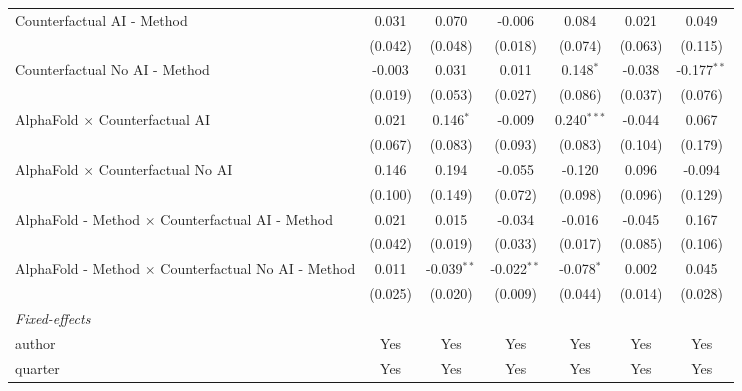 \begin{tabular}{lcccccc}
   Counterfactual AI - Method                                 & 0.031   & 0.070          & -0.006        & 0.084         & 0.021         & 0.049\\   
                                                              & (0.042) & (0.048)        & (0.018)       & (0.074)       & (0.063)       & (0.115)\\   
   Counterfactual No AI - Method                              & -0.003  & 0.031          & 0.011         & 0.148$^{*}$   & -0.038        & -0.177$^{**}$\\   
                                                              & (0.019) & (0.053)        & (0.027)       & (0.086)       & (0.037)       & (0.076)\\   
   AlphaFold $\times$ Counterfactual AI                       & 0.021   & 0.146$^{*}$    & -0.009        & 0.240$^{***}$ & -0.044        & 0.067\\   
                                                              & (0.067) & (0.083)        & (0.093)       & (0.083)       & (0.104)       & (0.179)\\   
   AlphaFold $\times$ Counterfactual No AI                    & 0.146   & 0.194          & -0.055        & -0.120        & 0.096         & -0.094\\   
                                                              & (0.100) & (0.149)        & (0.072)       & (0.098)       & (0.096)       & (0.129)\\   
   AlphaFold - Method $\times$ Counterfactual AI - Method     & 0.021   & 0.015          & -0.034        & -0.016        & -0.045        & 0.167\\   
                                                              & (0.042) & (0.019)        & (0.033)       & (0.017)       & (0.085)       & (0.106)\\   
   AlphaFold - Method $\times$ Counterfactual No AI - Method  & 0.011   & -0.039$^{**}$  & -0.022$^{**}$ & -0.078$^{*}$  & 0.002         & 0.045\\   
                                                              & (0.025) & (0.020)        & (0.009)       & (0.044)       & (0.014)       & (0.028)\\   
   \midrule
   \emph{Fixed-effects}\\
   author                                                     & Yes     & Yes            & Yes           & Yes           & Yes           & Yes\\  
   quarter                                                    & Yes     & Yes            & Yes           & Yes           & Yes           & Yes\\  

\end{tabular}
